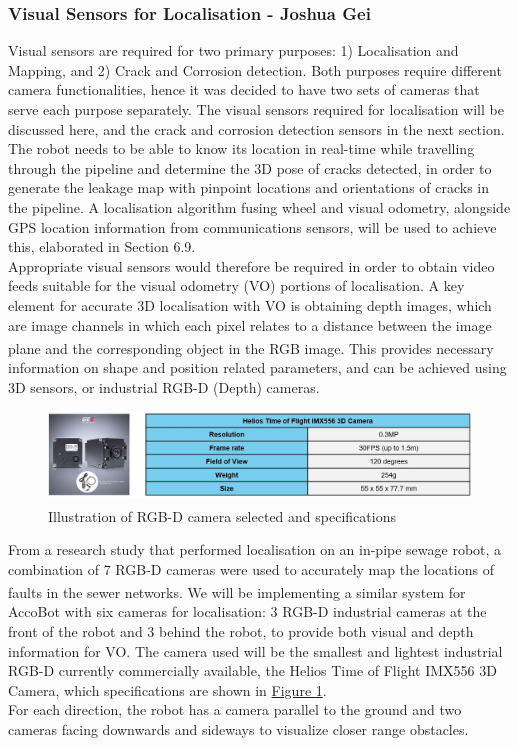 \documentclass[11pt]{article}		%
\newcommand{\supercite}[1]{\textsuperscript{\cite{#1}}}		%
\newcommand{\figref}[1]{\hyperref[#1]{Figure \ref*{#1}}}    %
\begin{document}
        \subsubsection{Visual Sensors for Localisation - Joshua Gei}
	        Visual sensors are required for two primary purposes: 1) Localisation and Mapping, and 2) Crack and Corrosion detection. Both purposes require different camera functionalities, hence it was decided to have two sets of cameras that serve each purpose separately. The visual sensors required for localisation will be discussed here, and the crack and corrosion detection sensors in the next section. 
	        \\ \hspace*{3ex}The robot needs to be able to know its location in real-time while travelling through the pipeline and determine the 3D pose of cracks detected, in order to generate the leakage map with pinpoint locations and orientations of cracks in the pipeline. A localisation algorithm fusing wheel and visual odometry, alongside GPS location information from communications sensors, will be used to achieve this, elaborated in Section 6.9.
            \\ \hspace*{3ex}Appropriate visual sensors would therefore be required in order to obtain video feeds suitable for the visual odometry (VO) portions of localisation. A key element for accurate 3D localisation with VO is obtaining depth images, which are image channels in which each pixel relates to a distance between the image plane and the corresponding object in the RGB image\supercite{visualodometry}. This provides necessary information on shape and position related parameters, and can be achieved using 3D sensors, or industrial RGB-D (Depth) cameras.
	        \begin{figure}[h]
				\centering
				\includegraphics[width=\textwidth]{3dcameratable.jpg}
				\caption{Illustration of RGB-D camera selected and specifications \supercite{camera}}
				\label{robotcamera}
			\end{figure}
	        From a research study that performed localisation on an in-pipe sewage robot, a combination of 7 RGB-D cameras were used to accurately map the locations of faults in the sewer networks\supercite{sewerpaper}. We will be implementing a similar system for AccoBot with six cameras for localisation: 3 RGB-D industrial cameras at the front of the robot and 3 behind the robot, to provide both visual and depth information for VO. The camera used will be the smallest and lightest industrial RGB-D currently commercially available, the Helios Time of Flight IMX556 3D Camera, which specifications are shown in \figref{robotcamera}. 
	        \\ \hspace*{3ex}For each direction, the robot has a camera parallel to the ground and two cameras facing downwards and sideways to visualize closer range obstacles. 
	        
\end{document}
